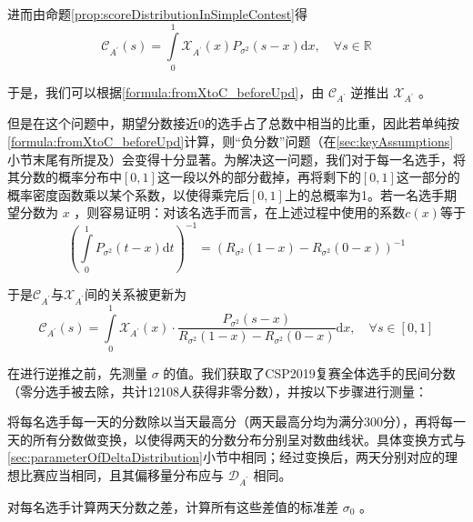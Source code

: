         进而由命题\ref{prop:scoreDistributionInSimpleContest}得
        \begin{equation}
            \mathcal{C}_{A^\prime}(s)=\int\limits_0^1 \mathcal{X}_{A^\prime}(x)P_{\sigma^2}(s-x)\mathrm{d}x,\quad\forall s\in\mathbb{R}
            \label{formula:fromXtoC_beforeUpd}
        \end{equation}

        于是，我们可以根据\eqref{formula:fromXtoC_beforeUpd}，由 $\mathcal{C}_{A^\prime}$ 逆推出 $\mathcal{X}_{A^\prime}$ 。

        但是在这个问题中，期望分数接近0的选手占了总数中相当的比重，因此若单纯按\eqref{formula:fromXtoC_beforeUpd}计算，则“负分数”问题（在\ref{sec:keyAssumptions}小节末尾有所提及）会变得十分显著。为解决这一问题，我们对于每一名选手，将其分数的概率分布中$[0,1]$这一段以外的部分截掉，再将剩下的$[0,1]$这一部分的概率密度函数乘以某个系数，以使得乘完后$[0,1]$上的总概率为1。若一名选手期望分数为 $x$ ，则容易证明：对该名选手而言，在上述过程中使用的系数$c(x)$等于 $$\left(\int\limits_0^1 P_{\sigma^2}(t-x)\mathrm{d}t\right)^{-1}=\left(R_{\sigma^2}(1-x)-R_{\sigma^2}(0-x)\right)^{-1}$$

        于是$\mathcal{C}_{A^\prime}$与$\mathcal{X}_{A^\prime}$间的关系被更新为
        \begin{equation}
            \mathcal{C}_{A^\prime}(s)=\int\limits_0^1 \mathcal{X}_{A^\prime}(x)\cdot\frac{P_{\sigma^2}(s-x)}{R_{\sigma^2}(1-x)-R_{\sigma^2}(0-x)}\mathrm{d}x,\quad\forall s\in[0,1]
            \label{formula:fromXtoC}
        \end{equation}

        \vspace{1.5ex}

        在进行逆推之前，先测量 $\sigma$ 的值。我们获取了CSP2019复赛全体选手的民间分数（零分选手被去除，共计12108人获得非零分数），并按以下步骤进行测量：
        \begin{asparaenum}[\bfseries{步骤} 1.]
            \item 将每名选手每一天的分数除以当天最高分（两天最高分均为满分300分），再将每一天的所有分数做变换，以使得两天的分数分布分别呈对数曲线状。具体变换方式与\ref{sec:parameterOfDeltaDistribution}小节中相同；经过变换后，两天分别对应的理想比赛应当相同，且其偏移量分布应与 $\mathcal{D}_{A^\prime}$ 相同。
            \item 对每名选手计算两天分数之差，计算所有这些差值的标准差 $\sigma_0$ 。
        \end{asparaenum}

        \vspace{1.5ex}

